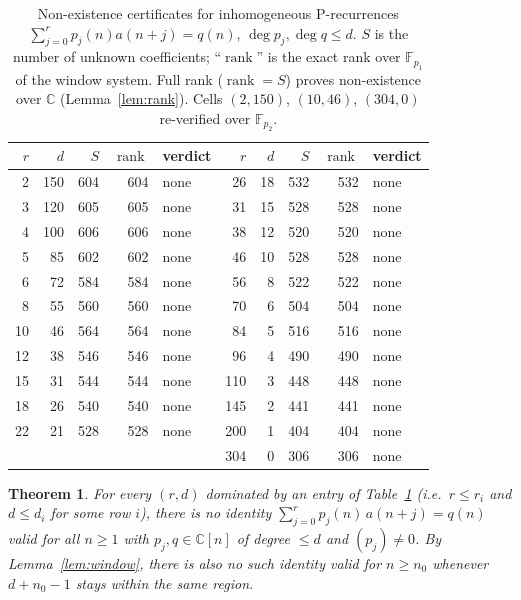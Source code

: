 \documentclass[11pt]{article}
\newtheorem{theorem}{Theorem}[section]
\theoremstyle{definition}
\DeclareMathOperator{\rank}{rank}
\newcommand{\CC}{\mathbb{C}}
\newcommand{\FF}{\mathbb{F}}
\begin{document}
\begin{table}[ht]
\centering\small
\begin{tabular}{rrrrl@{\qquad\qquad}rrrrl}
\toprule
$r$ & $d$ & $S$ & $\rank$ & verdict & $r$ & $d$ & $S$ & $\rank$ & verdict\\
\midrule
  2 & 150 & 604 & 604 & none &  26 & 18 & 532 & 532 & none\\
  3 & 120 & 605 & 605 & none &  31 & 15 & 528 & 528 & none\\
  4 & 100 & 606 & 606 & none &  38 & 12 & 520 & 520 & none\\
  5 &  85 & 602 & 602 & none &  46 & 10 & 528 & 528 & none\\
  6 &  72 & 584 & 584 & none &  56 &  8 & 522 & 522 & none\\
  8 &  55 & 560 & 560 & none &  70 &  6 & 504 & 504 & none\\
 10 &  46 & 564 & 564 & none &  84 &  5 & 516 & 516 & none\\
 12 &  38 & 546 & 546 & none &  96 &  4 & 490 & 490 & none\\
 15 &  31 & 544 & 544 & none & 110 &  3 & 448 & 448 & none\\
 18 &  26 & 540 & 540 & none & 145 &  2 & 441 & 441 & none\\
 22 &  21 & 528 & 528 & none & 200 &  1 & 404 & 404 & none\\
    &     &     &     &      & 304 &  0 & 306 & 306 & none\\
\bottomrule
\end{tabular}
\caption{Non-existence certificates for inhomogeneous P-recurrences
$\sum_{j=0}^{r}p_j(n)a(n+j)=q(n)$, $\deg p_j,\deg q\le d$. $S$ is the number of
unknown coefficients; ``$\rank$'' is the exact rank over $\FF_{p_1}$ of the
window system. Full rank ($\rank=S$) proves non-existence over $\CC$
(Lemma~\ref{lem:rank}). Cells $(2,150)$, $(10,46)$, $(304,0)$ re-verified over
$\FF_{p_2}$.}\label{tab:holo}
\end{table}

\begin{theorem}\label{thm:holo}
For every $(r,d)$ dominated by an entry of Table~\ref{tab:holo} (i.e.\ $r\le r_i$
and $d\le d_i$ for some row $i$), there is no identity
$\sum_{j=0}^{r}p_j(n)\,a(n+j)=q(n)$ valid for all $n\ge1$ with
$p_j,q\in\CC[n]$ of degree $\le d$ and $(p_j)\neq0$. By Lemma~\ref{lem:window},
there is also no such identity valid for $n\ge n_0$ whenever $d+n_0-1$ stays
within the same region.
\end{theorem}
\end{document}

